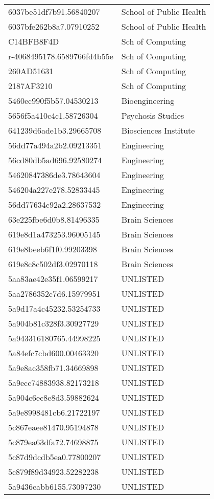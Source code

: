 \begin{tabular}{ll}
6037be51df7b91.56840207 & School of Public Health \\
6037bfe262b8a7.07910252 & School of Public Health \\
C14BFB8F4D & Sch of Computing \\
r-4068495178.6589766fd4b55e & Sch of Computing \\
260AD51631 & Sch of Computing \\
2187AF3210 & Sch of Computing \\
5460ec990f5b57.04530213 & Bioengineering \\
5656f5a410c4c1.58726304 & Psychosis Studies \\
641239d6ade1b3.29665708 & Biosciences Institute \\
56dd77a494a2b2.09213351 & Engineering \\
56cd80db5ad696.92580274 & Engineering \\
54620847386de3.78643604 & Engineering \\
546204a227e278.52833445 & Engineering \\
56dd77634c92a2.28637532 & Engineering \\
63e225fbe6d0b8.81496335 & Brain Sciences \\
619e8d1a473253.96005145 & Brain Sciences \\
619e8beeb6f1f0.99203398 & Brain Sciences \\
619e8c8c502df3.02970118 & Brain Sciences \\
5aa83ae42e35f1.06599217 & UNLISTED \\
5aa2786352c7d6.15979951 & UNLISTED \\
5a9d17a4c45232.53254733 & UNLISTED \\
5a904b81c328f3.30927729 & UNLISTED \\
5a943316180765.44998225 & UNLISTED \\
5a84efc7cbd600.00463320 & UNLISTED \\
5a9e8ac358fb71.34669898 & UNLISTED \\
5a9ecc74883938.82173218 & UNLISTED \\
5a904c6ec8e8d3.59882624 & UNLISTED \\
5a9e8998481cb6.21722197 & UNLISTED \\
5c867eaee81470.95194878 & UNLISTED \\
5c879ea63dfa72.74698875 & UNLISTED \\
5c87d9dcdb5ea0.77800207 & UNLISTED \\
5c879f89d34923.52282238 & UNLISTED \\
5a9436eabb6155.73097230 & UNLISTED \\

\end{tabular}
